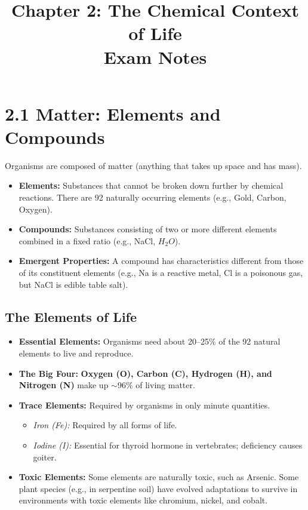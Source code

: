 \documentclass[11pt, a4paper]{article}
\title{\textbf{Chapter 2: The Chemical Context of Life \\ Exam Notes}}
\author{}
\date{}
\begin{document}
\maketitle

\section*{2.1 Matter: Elements and Compounds}
Organisms are composed of matter (anything that takes up space and has mass).
\begin{itemize}
    \item \textbf{Elements:} Substances that cannot be broken down further by chemical reactions. There are 92 naturally occurring elements (e.g., Gold, Carbon, Oxygen).
    \item \textbf{Compounds:} Substances consisting of two or more different elements combined in a fixed ratio (e.g., NaCl, $H_2O$).
    \item \textbf{Emergent Properties:} A compound has characteristics different from those of its constituent elements (e.g., Na is a reactive metal, Cl is a poisonous gas, but NaCl is edible table salt).
\end{itemize}

\subsection*{The Elements of Life}
\begin{itemize}
    \item \textbf{Essential Elements:} Organisms need about 20--25\% of the 92 natural elements to live and reproduce. 
    \item \textbf{The Big Four:} \textbf{Oxygen (O), Carbon (C), Hydrogen (H), and Nitrogen (N)} make up $\sim$96\% of living matter.
    \item \textbf{Trace Elements:} Required by organisms in only minute quantities.
    \begin{itemize}
        \item \textit{Iron (Fe):} Required by all forms of life.
        \item \textit{Iodine (I):} Essential for thyroid hormone in vertebrates; deficiency causes goiter.
    \end{itemize}
    \item \textbf{Toxic Elements:} Some elements are naturally toxic, such as Arsenic. Some plant species (e.g., in serpentine soil) have evolved adaptations to survive in environments with toxic elements like chromium, nickel, and cobalt.
\end{itemize}
\end{document}

